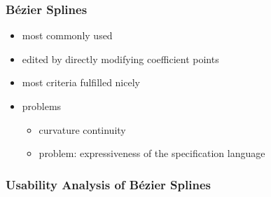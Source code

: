 \documentclass[mathserif]{beamer}
\begin{document}
		\begin{frame}
			\frametitle{Bézier Splines}
			\begin{itemize}
				\item most commonly used
				\item edited by directly modifying coefficient points
				\item most criteria fulfilled nicely
				\item problems
				\begin{itemize}
					\item curvature continuity
					\item problem: expressiveness of the specification language
				\end{itemize}
			\end{itemize}
		\end{frame}
		
		\begin{frame}
			\frametitle{Usability Analysis of Bézier Splines}
			\\
		\end{frame}
		
\end{document}
